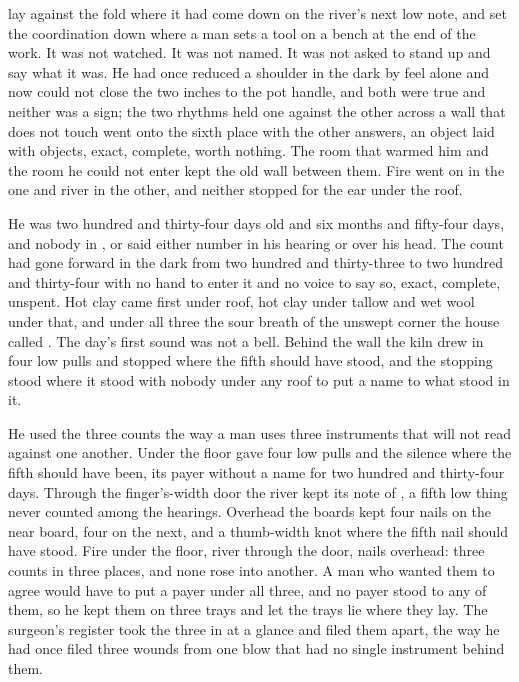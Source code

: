 
 lay against the fold where it had come down on the river's next low note, and  set the coordination down where a man sets a tool on a bench at the end of the work. It was not watched. It was not named. It was not asked to stand up and say what it was. He had once reduced a shoulder in the dark by feel alone and now could not close the two inches to the pot handle, and both were true and neither was a sign; the two rhythms held one against the other across a wall that does not touch went onto the sixth place with the other answers, an object laid with objects, exact, complete, worth nothing. The room that warmed him and the room he could not enter kept the old wall between them. Fire went on in the one and river in the other, and neither stopped for the ear under the roof.

He was two hundred and thirty-four days old and six months and fifty-four days, and nobody in ,  or  said either number in his hearing or over his head. The count had gone forward in the dark from two hundred and thirty-three to two hundred and thirty-four with no hand to enter it and no voice to say so, exact, complete, unspent. Hot clay came first under  roof, hot clay under tallow and wet wool under that, and under all three the sour  breath of the unswept corner the house called . The day's first sound was not a bell. Behind the wall the kiln drew in four low pulls and stopped where the fifth should have stood, and the stopping stood where it stood with nobody under any roof to put a name to what stood in it.

He used the three counts the way a man uses three instruments that will not read against one another. Under the floor  gave four low pulls and the silence where the fifth should have been, its payer without a name for two hundred and thirty-four days. Through the finger's-width door the river kept its note of , a fifth low thing never counted among the hearings. Overhead the boards kept four nails on the near board, four on the next, and a thumb-width knot where the fifth nail should have stood. Fire under the floor, river through the door, nails overhead: three counts in three places, and none rose into another. A man who wanted them to agree would have to put a payer under all three, and no payer stood to any of them, so he kept them on three trays and let the trays lie where they lay. The surgeon's register took the three in at a glance and filed them apart, the way he had once filed three wounds from one blow that had no single instrument behind them.

